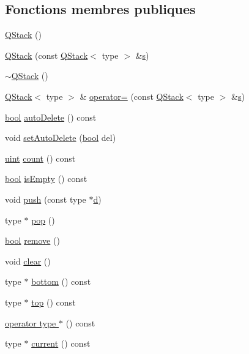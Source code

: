 \subsection*{Fonctions membres publiques}
\begin{DoxyCompactItemize}
\item 
\hyperlink{class_q_stack_a7198329515993f831fd68018b814c879}{Q\+Stack} ()
\item 
\hyperlink{class_q_stack_a7da26d860d102eff183135d3fa599870}{Q\+Stack} (const \hyperlink{class_q_stack}{Q\+Stack}$<$ type $>$ \&\hyperlink{060__command__switch_8tcl_a011c73f2dbb87635a3b4206c72355f6e}{s})
\item 
\hyperlink{class_q_stack_a22c1603fe003a1cdb4c96c752d9f976a}{$\sim$\+Q\+Stack} ()
\item 
\hyperlink{class_q_stack}{Q\+Stack}$<$ type $>$ \& \hyperlink{class_q_stack_a87144ce6ce778c8d76363d68b6129d62}{operator=} (const \hyperlink{class_q_stack}{Q\+Stack}$<$ type $>$ \&\hyperlink{060__command__switch_8tcl_a011c73f2dbb87635a3b4206c72355f6e}{s})
\item 
\hyperlink{qglobal_8h_a1062901a7428fdd9c7f180f5e01ea056}{bool} \hyperlink{class_q_stack_ae2b09648a4e7c80e90ff739044cb646d}{auto\+Delete} () const 
\item 
void \hyperlink{class_q_stack_a55152b44c464b3a9c8104f6173b7cc4f}{set\+Auto\+Delete} (\hyperlink{qglobal_8h_a1062901a7428fdd9c7f180f5e01ea056}{bool} del)
\item 
\hyperlink{qglobal_8h_a4d3943ddea65db7163a58e6c7e8df95a}{uint} \hyperlink{class_q_stack_a8caaeccca272c5420be59141332e0d32}{count} () const 
\item 
\hyperlink{qglobal_8h_a1062901a7428fdd9c7f180f5e01ea056}{bool} \hyperlink{class_q_stack_a957c01ecc8e8648031e52b38b184be21}{is\+Empty} () const 
\item 
void \hyperlink{class_q_stack_ad21cdb38c5b76acfd3a534fd2a77b478}{push} (const type $\ast$\hyperlink{060__command__switch_8tcl_af43f4b1f0064a33b2d662af9f06d3a00}{d})
\item 
type $\ast$ \hyperlink{class_q_stack_a9e5fca8d076435018fbe07efa38f14a2}{pop} ()
\item 
\hyperlink{qglobal_8h_a1062901a7428fdd9c7f180f5e01ea056}{bool} \hyperlink{class_q_stack_a74f126d3f9e6ae6f472ebf5d445633e2}{remove} ()
\item 
void \hyperlink{class_q_stack_a07ac0d10d6912270790d0c1a82ee2715}{clear} ()
\item 
type $\ast$ \hyperlink{class_q_stack_a9ee18181303102e9392dd2b3534366db}{bottom} () const 
\item 
type $\ast$ \hyperlink{class_q_stack_ad4d52ef93cc7e75f9fd58e6eeba3e633}{top} () const 
\item 
\hyperlink{class_q_stack_a953045c0b94135287b6b3551ad9198c8}{operator type $\ast$} () const 
\item 
type $\ast$ \hyperlink{class_q_stack_ac8ee9efbdaf251ca03bd5bf598387bc2}{current} () const 
\end{DoxyCompactItemize}


